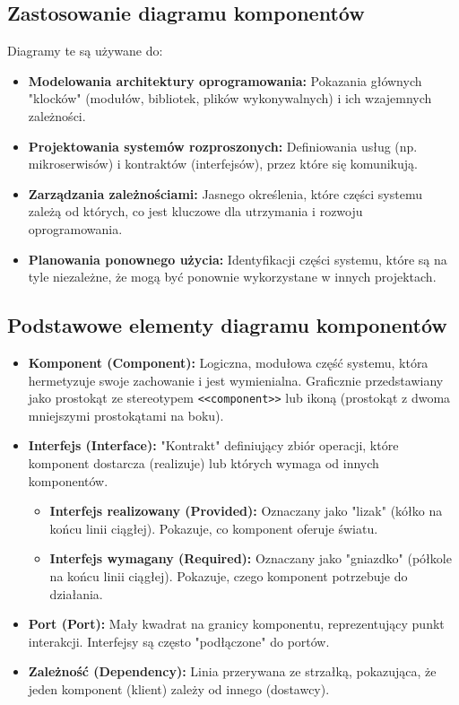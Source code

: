 \documentclass[a4paper,12pt]{article}
\begin{document}
\subsection{Zastosowanie diagramu komponentów}

Diagramy te są używane do:
\begin{itemize}
    \item \textbf{Modelowania architektury oprogramowania:} Pokazania głównych "klocków" (modułów, bibliotek, plików wykonywalnych) i ich wzajemnych zależności.
    \item \textbf{Projektowania systemów rozproszonych:} Definiowania usług (np. mikroserwisów) i kontraktów (interfejsów), przez które się komunikują.
    \item \textbf{Zarządzania zależnościami:} Jasnego określenia, które części systemu zależą od których, co jest kluczowe dla utrzymania i rozwoju oprogramowania.
    \item \textbf{Planowania ponownego użycia:} Identyfikacji części systemu, które są na tyle niezależne, że mogą być ponownie wykorzystane w innych projektach.
\end{itemize}

\subsection{Podstawowe elementy diagramu komponentów}
\begin{itemize}
    \item \textbf{Komponent (Component):} Logiczna, modułowa część systemu, która hermetyzuje swoje zachowanie i jest wymienialna. Graficznie przedstawiany jako prostokąt ze stereotypem \texttt{<<component>>} lub ikoną (prostokąt z dwoma mniejszymi prostokątami na boku).
    \item \textbf{Interfejs (Interface):} "Kontrakt" definiujący zbiór operacji, które komponent dostarcza (realizuje) lub których wymaga od innych komponentów.
        \begin{itemize}
            \item \textbf{Interfejs realizowany (Provided):} Oznaczany jako "lizak" (kółko na końcu linii ciągłej). Pokazuje, co komponent oferuje światu.
            \item \textbf{Interfejs wymagany (Required):} Oznaczany jako "gniazdko" (półkole na końcu linii ciągłej). Pokazuje, czego komponent potrzebuje do działania.
        \end{itemize}
    \item \textbf{Port (Port):} Mały kwadrat na granicy komponentu, reprezentujący punkt interakcji. Interfejsy są często "podłączone" do portów.
    \item \textbf{Zależność (Dependency):} Linia przerywana ze strzałką, pokazująca, że jeden komponent (klient) zależy od innego (dostawcy).
\end{itemize}
\end{document}
